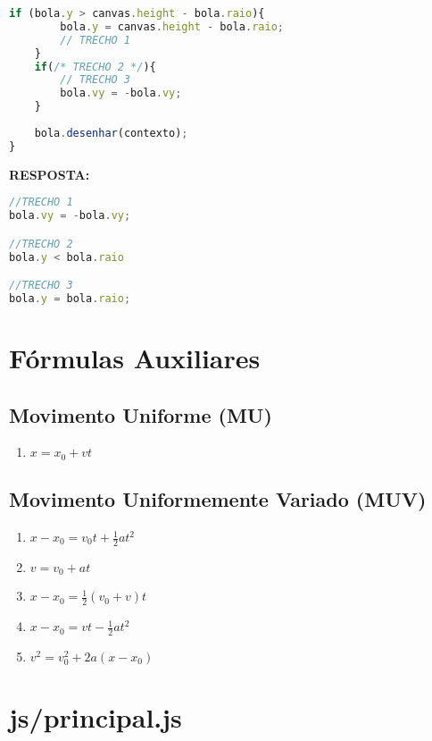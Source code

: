 \documentclass[12pt,a4paper,oneside]{article}
\begin{document}
\begin{enumerate}
\begin{lstlisting}[language=JavaScript]
	if (bola.y > canvas.height - bola.raio){ 
		bola.y = canvas.height - bola.raio; 
		// TRECHO 1
	}
	if(/* TRECHO 2 */){
		// TRECHO 3
		bola.vy = -bola.vy;
	}
	
	bola.desenhar(contexto); 
}\end{lstlisting}

{\color{blue} \bf RESPOSTA: } \\
\begin{lstlisting}[language=JavaScript]
//TRECHO 1
bola.vy = -bola.vy;

//TRECHO 2
bola.y < bola.raio

//TRECHO 3
bola.y = bola.raio;
\end{lstlisting}


\end{enumerate}

\newpage
 
\section{Fórmulas Auxiliares}

\subsection{Movimento Uniforme (MU)}

\begin{enumerate}
\item $x = x_0 + vt$ 
\end{enumerate}

\subsection{Movimento Uniformemente Variado (MUV)}

\begin{enumerate}
\item $x - x_0 = v_0t + \frac{1}{2}at^2$ 
\item $v = v_0 + at$ 
\item $x - x_0 = \frac{1}{2}(v_0 + v)t$ 
\item $x - x_0 = vt - \frac{1}{2} a t^2$
\item $v^2 = v_0^2 + 2a(x - x_0)$
\end{enumerate}

\section*{js/principal.js}
\end{document}
